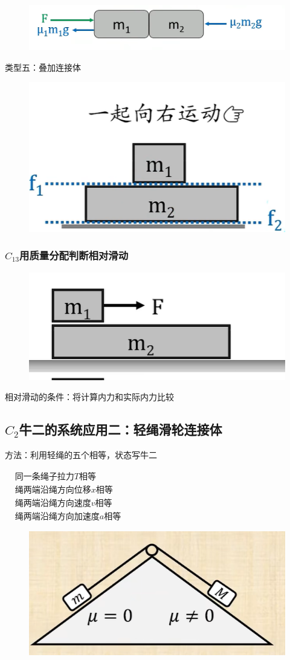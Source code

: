 \documentclass[lang=cn,10pt]{elegantbook}
\begin{document}
    \begin{figure}[H]
    	\centering
    	\includegraphics[width=0.4\linewidth]{image/38}
    \end{figure}
    
    类型五：叠加连接体
    \begin{figure}[H]
    	\centering
    	\includegraphics[width=0.4\linewidth]{image/39}
    \end{figure}
    \subsubsection{$C_{13}$用质量分配判断相对滑动}
    \begin{figure}[H]
    	\centering
    	\includegraphics[width=0.4\linewidth]{image/40}
    \end{figure}
    \vspace{3cm}
    \begin{remark}
    	相对滑动的条件：将计算内力和实际内力比较
    \end{remark}
      \subsection{$C_{2}$牛二的系统应用二：轻绳滑轮连接体}
      
      方法：利用轻绳的五个相等，状态写牛二
      
      $\begin{aligned}&\text{同一条绳子拉力}T\text{相等}\\&\text{绳两端沿绳方向位移}x\text{相等}\\&\text{绳两端沿绳方向速度}v\text{相等}\\&\text{绳两端沿绳方向加速度}a\text{相等}\end{aligned}$
      \begin{figure}[H]
      	\centering
      	\includegraphics[width=0.3\linewidth]{image/41}
      \end{figure}
\end{document}
